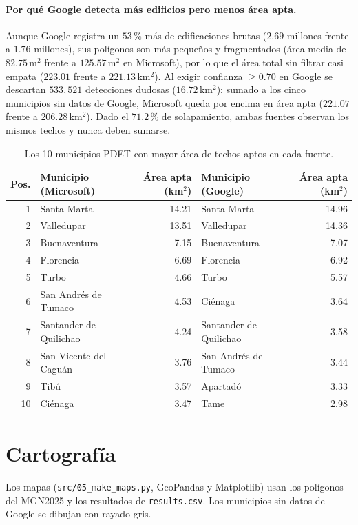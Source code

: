 \documentclass[12pt, letterpaper]{article}
\begin{document}
\paragraph{Por qué Google detecta más edificios pero menos área apta.} Aunque Google registra un $53\,\%$ más de edificaciones brutas ($2.69$ millones frente a $1.76$ millones), sus polígonos son más pequeños y fragmentados (área media de $82.75$\,m$^2$ frente a $125.57$\,m$^2$ en Microsoft), por lo que el área total sin filtrar casi empata ($223.01$ frente a $221.13$\,km$^2$). Al exigir confianza $\ge 0.70$ en Google se descartan $533{,}521$ detecciones dudosas ($16.72$\,km$^2$); sumado a los cinco municipios sin datos de Google, Microsoft queda por encima en área apta ($221.07$ frente a $206.28$\,km$^2$). Dado el $71.2\,\%$ de solapamiento, ambas fuentes observan los mismos techos y nunca deben sumarse.

\begin{table}[H]
\centering
\small
{}
\footnotesize\setlength{\tabcolsep}{4.5pt}\begin{tabular}{r l r l r}
\toprule
\textbf{Pos.} & \textbf{Municipio (Microsoft)} & \textbf{Área apta (km$^2$)} & \textbf{Municipio (Google)} & \textbf{Área apta (km$^2$)} \\
\midrule
1 & Santa Marta & 14.21 & Santa Marta & 14.96 \\
2 & Valledupar & 13.51 & Valledupar & 14.36 \\
3 & Buenaventura & 7.15 & Buenaventura & 7.07 \\
4 & Florencia & 6.69 & Florencia & 6.92 \\
5 & Turbo & 4.66 & Turbo & 5.57 \\
6 & San Andrés de Tumaco & 4.53 & Ciénaga & 3.64 \\
7 & Santander de Quilichao & 4.24 & Santander de Quilichao & 3.58 \\
8 & San Vicente del Caguán & 3.76 & San Andrés de Tumaco & 3.44 \\
9 & Tibú & 3.57 & Apartadó & 3.33 \\
10 & Ciénaga & 3.47 & Tame & 2.98 \\
\bottomrule
\end{tabular}
\caption{Los 10 municipios PDET con mayor área de techos aptos en cada fuente.}
\label{tab:ranking_top10}
\end{table}

\section{Cartografía}\label{sec:mapas}
Los mapas (\texttt{src/05\_make\_maps.py}, GeoPandas y Matplotlib) usan los polígonos del MGN2025 y los resultados de \texttt{results.csv}. Los municipios sin datos de Google se dibujan con rayado gris.
\end{document}
